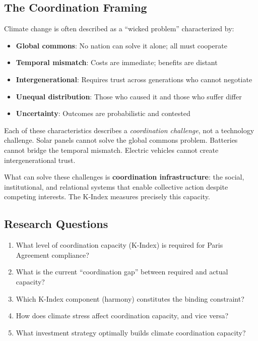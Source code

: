 \documentclass[12pt,a4paper]{article}
\begin{document}
\subsection{The Coordination Framing}

Climate change is often described as a ``wicked problem'' characterized by:

\begin{itemize}
    \item \textbf{Global commons}: No nation can solve it alone; all must cooperate
    \item \textbf{Temporal mismatch}: Costs are immediate; benefits are distant
    \item \textbf{Intergenerational}: Requires trust across generations who cannot negotiate
    \item \textbf{Unequal distribution}: Those who caused it and those who suffer differ
    \item \textbf{Uncertainty}: Outcomes are probabilistic and contested
\end{itemize}

Each of these characteristics describes a \textit{coordination challenge}, not a technology challenge. Solar panels cannot solve the global commons problem. Batteries cannot bridge the temporal mismatch. Electric vehicles cannot create intergenerational trust.

What can solve these challenges is \textbf{coordination infrastructure}: the social, institutional, and relational systems that enable collective action despite competing interests. The K-Index measures precisely this capacity.

\subsection{Research Questions}

\begin{enumerate}
    \item What level of coordination capacity (K-Index) is required for Paris Agreement compliance?
    \item What is the current ``coordination gap'' between required and actual capacity?
    \item Which K-Index component (harmony) constitutes the binding constraint?
    \item How does climate stress affect coordination capacity, and vice versa?
    \item What investment strategy optimally builds climate coordination capacity?
\end{enumerate}
\end{document}

